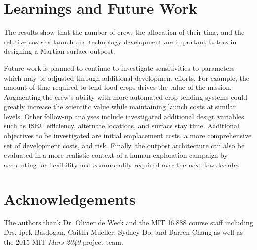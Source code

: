 \documentclass[]{aiaa-pretty}
\begin{document}
\section{Learnings and Future Work} 
The results show that the number of crew, the allocation of their time, and the relative costs of launch and technology development are important factors in designing a Martian surface outpost. 

Future work is planned to continue to investigate sensitivities to parameters which may be adjusted through additional development efforts. For example, the amount of time required to tend food crops drives the value of the mission. Augmenting the crew's ability with more automated crop tending systems could greatly increase the scientific value while maintaining launch costs at similar levels. Other follow-up analyses include investigated additional design variables such as ISRU efficiency, alternate locations, and surface stay time. Additional objectives to be investigated are initial emplacement costs, a more comprehensive set of development costs, and risk. Finally, the outpost architecture can also be evaluated in a more realistic context of a human exploration campaign by accounting for flexibility and commonality required over the next few decades.



\appendix


\section*{Acknowledgements}
The authors thank Dr. Olivier de Weck and the MIT 16.888 course staff including Drs. Ipek Basdogan, Caitlin Mueller, Sydney Do, and Darren Chang as well as the 2015 MIT \textit{Mars 2040} project team.



\end{document}
